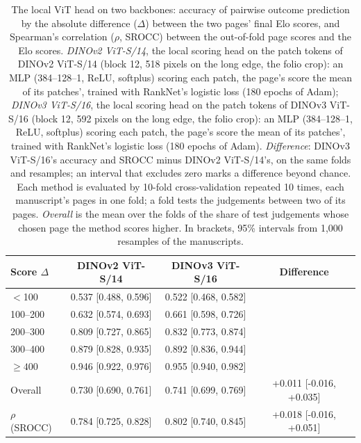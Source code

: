 \begin{table}[htbp]
  \centering
  \caption{The local ViT head on two backbones: accuracy of pairwise outcome prediction by the absolute difference ($\Delta$) between the two pages' final Elo scores, and Spearman's correlation ($\rho$, SROCC) between the out-of-fold page scores and the Elo scores. \emph{DINOv2 ViT-S/14}, the local scoring head on the patch tokens of DINOv2 ViT-S/14 (block 12, 518 pixels on the long edge, the folio crop): an MLP (384--128--1, ReLU, softplus) scoring each patch, the page's score the mean of its patches', trained with RankNet's logistic loss (180 epochs of Adam); \emph{DINOv3 ViT-S/16}, the local scoring head on the patch tokens of DINOv3 ViT-S/16 (block 12, 592 pixels on the long edge, the folio crop): an MLP (384--128--1, ReLU, softplus) scoring each patch, the page's score the mean of its patches', trained with RankNet's logistic loss (180 epochs of Adam). \emph{Difference}: DINOv3 ViT-S/16's accuracy and SROCC minus DINOv2 ViT-S/14's, on the same folds and resamples; an interval that excludes zero marks a difference beyond chance. Each method is evaluated by 10-fold cross-validation repeated 10 times, each manuscript's pages in one fold; a fold tests the judgements between two of its pages. \emph{Overall} is the mean over the folds of the share of test judgements whose chosen page the method scores higher. In brackets, 95\% intervals from 1,000 resamples of the manuscripts.}
  \label{tab:vit_backbones}
  \begin{tabular}{lccc}
    \toprule
    Score $\Delta$ & DINOv2 ViT-S/14 & DINOv3 ViT-S/16 & Difference \\
    \midrule
    $<$100 & 0.537 [0.488, 0.596] & 0.522 [0.468, 0.582] &  \\
    100--200 & 0.632 [0.574, 0.693] & 0.661 [0.598, 0.726] &  \\
    200--300 & 0.809 [0.727, 0.865] & 0.832 [0.773, 0.874] &  \\
    300--400 & 0.879 [0.828, 0.935] & 0.892 [0.836, 0.944] &  \\
    $\geq 400$ & 0.946 [0.922, 0.976] & 0.955 [0.940, 0.982] &  \\
    \midrule
    Overall & 0.730 [0.690, 0.761] & 0.741 [0.699, 0.769] & +0.011 [-0.016, +0.035] \\
    \midrule
    $\rho$ (SROCC) & 0.784 [0.725, 0.828] & 0.802 [0.740, 0.845] & +0.018 [-0.016, +0.051] \\
    \bottomrule
  \end{tabular}
\end{table}
